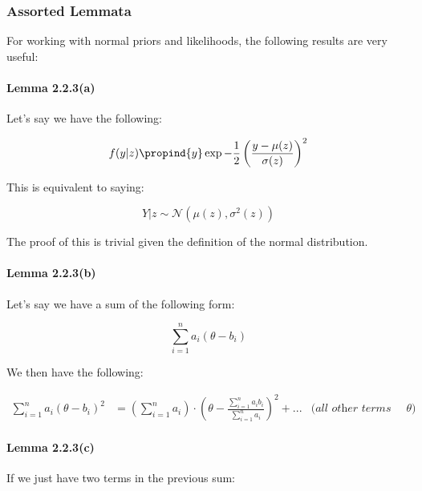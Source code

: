 \documentclass[a4paper]{article}
\begin{document}
            \subsubsection{Assorted Lemmata}
                For working with normal priors and likelihoods, the following
                results are very useful:

                \paragraph{Lemma 2.2.3(a)}
                    Let's say we have the following:

                    \[
                        f(y | z) \propind{y} \exp{-\frac{1}{2}\left(
                        \frac{y - \mu(z)}{\sigma(z)}\right)^2}
                    \]

                    This is equivalent to saying:

                    \[
                        Y | z \sim \mathcal{N}(\mu(z), \sigma^2(z))
                    \]

                    The proof of this is trivial given the definition of the
                    normal distribution.

                \paragraph{Lemma 2.2.3(b)}
                    Let's say we have a sum of the following form:

                    \[
                        \sum_{i=1}^n a_i (\theta - b_i)
                    \]

                    We then have the following:

                    \begin{align*}
                        \sum_{i=1}^n a_i (\theta - b_i)^2 & = \left(\sum_{i=1}^n
                            a_i\right) \cdot \left(\theta - \frac{\sum_{i=1}^n
                            a_ib_i}{\sum_{i=1}^n a_i}\right)^2 + ... &
                            \textit{(all other terms are independent of
                            $\theta$)}
                    \end{align*}

                \paragraph{Lemma 2.2.3(c)}
                    If we just have two terms in the previous sum:
\end{document}
